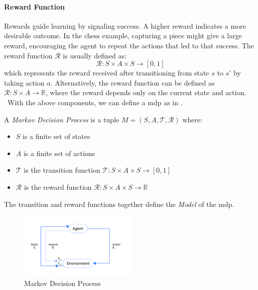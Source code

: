 \paragraph{Reward Function}
Rewards guide learning by signaling success. A higher reward indicates a more 
desirable outcome. In the chess example, capturing a piece might give a large reward, encouraging the 
agent to repeat the actions that led to that success. The reward function $\mathcal{R}$ is usually defined as:
$$\mathcal{R} : S \times A \times S \rightarrow [0,1]$$
which represents the reward received after transitioning from state $s$ to $s'$ by taking action $a$.
Alternatively, the reward function can be defined as $\mathcal{R} : S \times A \rightarrow \mathbb{R}$, 
where the reward depends only on the current state and action. \\


\ With the above components, we can define a \gls{mdp} as in .

\begin{definition}
A \textit{Markov Decision Process} is a tuple $M = (S, A, \mathcal{T}, \mathcal{R})$ where:
\begin{itemize}
    \setlength\itemsep{0.01em}
    \item $S$ is a finite set of states
    \item $A$ is a finite set of actions
    \item $\mathcal{T}$ is the transition function $\mathcal{T} : S \times A \times S \rightarrow [0,1]$
    \item $\mathcal{R}$ is the reward function $\mathcal{R} : S \times A \times S \rightarrow \mathbb{R}$
\end{itemize}
\end{definition}
The transition and reward functions together define the \emph{Model} of
the \gls{mdp}.

\begin{figure}[H]
    \centering
    \includegraphics[width=0.5\textwidth]{images/MDP.png}
    \caption{Markov Decision Process}
    \label{fig:mdp}
\end{figure}

